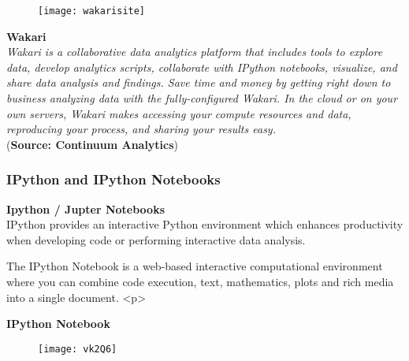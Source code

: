\begin{frame}
	\begin{figure}
\centering
\texttt{[image: wakarisite]}

\end{figure}

\end{frame}
\begin{frame}
\Large
\textbf{Wakari}\\
\textit{
Wakari is a collaborative data analytics platform that includes tools to explore data, develop analytics scripts, collaborate with IPython notebooks, visualize, and share data analysis and findings. Save time and money by getting right down to business analyzing data with the fully-configured Wakari. In the cloud or on your own servers, Wakari makes accessing your compute resources and data, reproducing your process, and sharing your results easy.}\\(\textbf{Source: Continuum Analytics})
\end{frame}

	
%
%
%
%
%
\begin{frame}
\frametitle{IPython and IPython Notebooks}
\Large
\noindent \textbf{Ipython / Jupter Notebooks}\\

 IPython provides an interactive Python environment which enhances productivity when developing code
or performing interactive data analysis.\\ \bigskip

 The IPython Notebook is a web-based interactive computational environment where you can combine code execution, text, mathematics, plots and rich media into a single document.
<p>

\end{frame}
\begin{frame}
\textbf{IPython Notebook}
	\begin{figure}
\centering
\texttt{[image: vk2Q6]}

\end{figure}

\end{frame}

